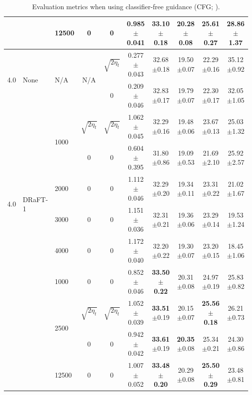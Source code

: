 \begin{table}[h!]
{\begin{tabular}{lllccccccc}
    & & 12500 & 0 & 0 & 0.985{\tiny$\pm$0.041} & 33.10{\tiny$\pm$0.18} & 20.28{\tiny$\pm$0.08} & \textbf{25.61{\tiny$\pm$0.27}} & 28.86{\tiny$\pm$1.37} \\
    \midrule
    \multirow{2}{*}{4.0} & \multirow{2}{*}{None} &  \multirow{2}{*}{N/A}        & \multirow{2}{*}{N/A}          & $\sqrt{2 \eta_t}$         & 0.277{\tiny$\pm$0.043} & 32.68{\tiny$\pm$0.18} & 19.50{\tiny$\pm$0.07} & 22.29{\tiny$\pm$0.16} & 35.12{\tiny$\pm$0.92} \\
     &  &       &                & 0                 & 0.209{\tiny$\pm$0.046} & 32.83{\tiny$\pm$0.17} & 19.79{\tiny$\pm$0.07} & 22.30{\tiny$\pm$0.17} & 32.05{\tiny$\pm$1.05}    
                                    \\
    \midrule
    \multirow{6}{*}{4.0} & \multirow{6}{*}{DRaFT-1} &  \multirow{2}{*}{1000}        & $\sqrt{2 \eta_t}$          & $\sqrt{2 \eta_t}$         & 1.062{\tiny$\pm$0.045} & 32.29{\tiny$\pm$0.16} & 19.48{\tiny$\pm$0.06} & 23.67{\tiny$\pm$0.13} & 25.03{\tiny$\pm$1.32} \\
     &  &       & 0                 & 0                 & 0.604{\tiny$\pm$0.395} & 31.80{\tiny$\pm$0.86} & 19.09{\tiny$\pm$0.53} & 21.69{\tiny$\pm$2.10} & 25.92{\tiny$\pm$2.57} \\
    \addlinespace
     &  &  2000        & 0                 & 0                 & 1.112{\tiny$\pm$0.046} & 32.29{\tiny$\pm$0.20} & 19.34{\tiny$\pm$0.11} & 23.31{\tiny$\pm$0.22} & 21.02{\tiny$\pm$1.67} \\
    \addlinespace
    & & 3000 & 0                 & 0                 & 1.151{\tiny$\pm$0.036} & 32.31{\tiny$\pm$0.21} & 19.36{\tiny$\pm$0.06} & 23.29{\tiny$\pm$0.14} & 19.53{\tiny$\pm$1.24} \\
    \addlinespace
    & &  4000  & 0 & 0 & 1.172{\tiny$\pm$0.040} & 32.20{\tiny$\pm$0.22} & 19.30{\tiny$\pm$0.07} & 23.20{\tiny$\pm$0.15} & 18.45{\tiny$\pm$1.06} \\
    \midrule
    \multirow{5}{*}{4.0} & \multirow{5}{*}{Adj.-Match.} & 1000 & 0                 & 0                 & 0.852{\tiny$\pm$0.046} & \textbf{33.50{\tiny$\pm$0.22}} & 20.31{\tiny$\pm$0.08} & 24.97{\tiny$\pm$0.19} & 25.83{\tiny$\pm$0.82} \\
    \addlinespace
    & & \multirow{2}{*}{2500} & $\sqrt{2 \eta_t}$ & $\sqrt{2 \eta_t}$ & 1.052{\tiny$\pm$0.039} & \textbf{33.51}{\tiny$\pm$0.19} & 20.15{\tiny$\pm$0.07} & \textbf{25.56{\tiny$\pm$0.18}} & 26.21{\tiny$\pm$0.73} \\
    & &  & 0 & 0 & 0.942{\tiny$\pm$0.042} & \textbf{33.61}{\tiny$\pm$0.19} & \textbf{20.35}{\tiny$\pm$0.08} & 25.34{\tiny$\pm$0.21} & 24.30{\tiny$\pm$0.86} \\
    \addlinespace
    & & 12500 & 0 & 0 & 1.007{\tiny$\pm$0.052} & \textbf{33.48{\tiny$\pm$0.20}} & 20.29{\tiny$\pm$0.08} & \textbf{25.50{\tiny$\pm$0.29}} & 23.48{\tiny$\pm$0.81} \\
    \bottomrule
\end{tabular}
}
\caption{ 
Evaluation metrics when using classifier-free guidance (CFG; \citet{ho2022classifier}).
}
\end{table}

